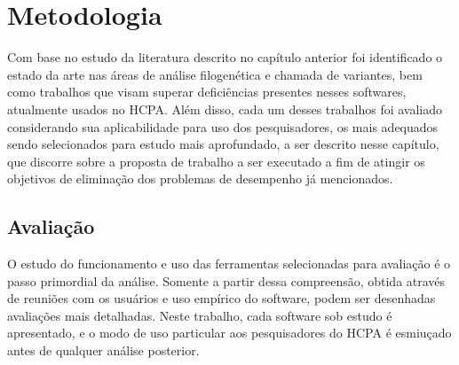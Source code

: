 \documentclass[cic,tc]{iiufrgs}
\begin{document}
%
%
%
%

\chapter{Metodologia}
\label{chap:mod}

Com base no estudo da literatura descrito no capítulo anterior foi identificado
o estado da arte nas áreas de análise filogenética e chamada de variantes, bem
como trabalhos que visam superar deficiências presentes nesses softwares,
atualmente usados no HCPA. Além disso, cada um desses trabalhos foi avaliado
considerando sua aplicabilidade para uso dos pesquisadores, os mais adequados
sendo selecionados para estudo mais aprofundado, a ser descrito nesse capítulo,
que discorre sobre a proposta de trabalho a ser executado a fim de atingir os
objetivos de eliminação dos problemas de desempenho já mencionados.

\section{Avaliação}
\label{sec:eval}

O estudo do funcionamento e uso das ferramentas selecionadas para avaliação é o
passo primordial da análise. Somente a partir dessa compreensão, obtida através
de reuniões com os usuários e uso empírico do software, podem ser desenhadas
avaliações mais detalhadas. Neste trabalho, cada software sob estudo é
apresentado, e o modo de uso particular aos pesquisadores do HCPA é esmiuçado
antes de qualquer análise posterior.
\end{document}
